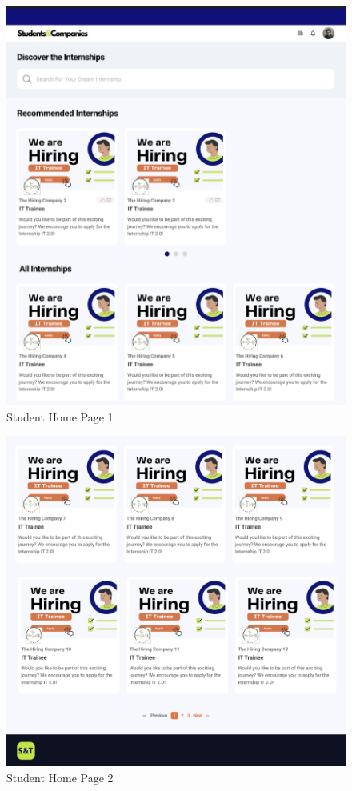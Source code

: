 \documentclass{article}
\begin{document}
    \begin{figure}[H]
    \centering
    \includegraphics[scale = 0.40]{figures/UserInterfaces/Student/HomePage1.png}
    \caption{Student Home Page 1}
     \centering
\end{figure}

\begin{figure}[H]
    \centering
    \includegraphics[scale = 0.40]{figures/UserInterfaces/Student/HomePage2.png}
    \caption{Student Home Page 2}
     \centering
\end{figure}
\end{document}
